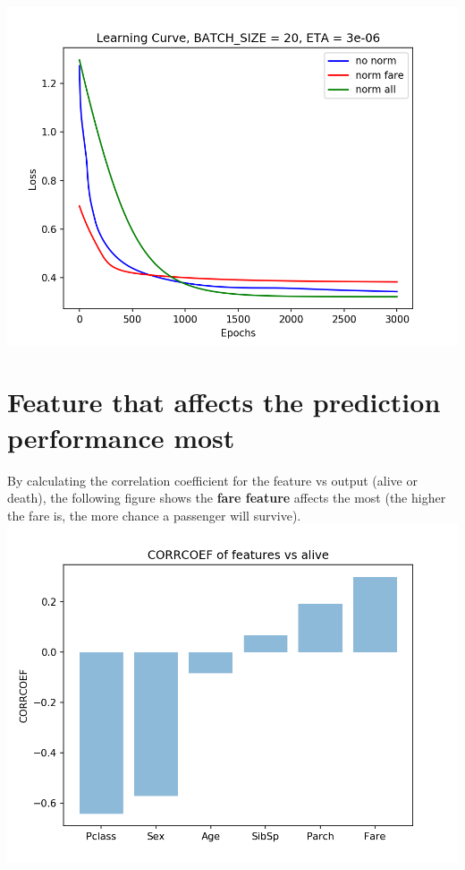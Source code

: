 \documentclass[11pt, a4paper]{article} %
\begin{document}
\\ \includegraphics[scale = 0.5]{figure_2/NORM_LC.png}

\section{Feature that affects the prediction performance most}
By calculating the correlation coefficient for the feature vs output (alive or death), the following figure shows the \textbf{fare feature} affects the most (the higher the fare is, the more chance a passenger will survive).
\\ \includegraphics[scale = 1.0]{figure_2/CORRCOEF.png}
\end{document}
